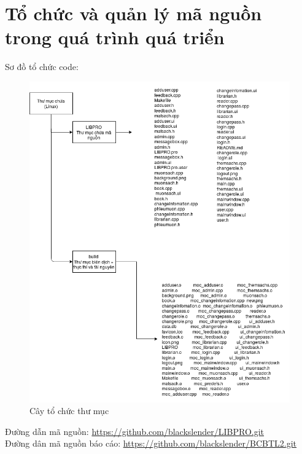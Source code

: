 \documentclass[a4paper]{article}
\begin{document}
\section{Tổ chức và quản lý mã nguồn trong quá trình quá triển}
Sơ đồ tổ chức code:\\
\begin{figure}[h!]
	\begin{center}
		\includegraphics[scale=.5]{folderStructure.png}
		\caption{Cây tổ chức thư mục}
	\end{center}
\end{figure}
	\newpage \newpage 

Đường dẫn mã nguồn: \url{https://github.com/blackslender/LIBPRO.git}\\
Đường dân mã nguồn báo cáo: \url{https://github.com/blackslender/BCBTL2.git}\\
\end{document}
